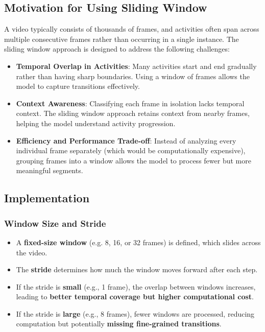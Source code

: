 \documentclass{article}
\begin{document}
\subsection{Motivation for Using Sliding Window}
A video typically consists of thousands of frames, and activities often span across multiple consecutive frames rather than occurring in a single instance. The sliding window approach is designed to address the following challenges:
\begin{itemize}
    \item \textbf{Temporal Overlap in Activities}: Many activities start and end gradually rather than having sharp boundaries. Using a window of frames allows the model to capture transitions effectively.
    \item \textbf{Context Awareness}: Classifying each frame in isolation lacks temporal context. The sliding window approach retains context from nearby frames, helping the model understand activity progression.
    \item \textbf{Efficiency and Performance Trade-off}: Instead of analyzing every individual frame separately (which would be computationally expensive), grouping frames into a window allows the model to process fewer but more meaningful segments.
\end{itemize}
\subsection{Implementation}
\subsubsection{Window Size and Stride}
\begin{itemize}
    \item A \textbf{fixed-size window} (e.g. 8, 16, or 32 frames) is defined, which slides across the video.
    \item The \textbf{stride} determines how much the window moves forward after each step.
    \item If the stride is \textbf{small} (e.g., 1 frame), the overlap between windows increases, leading to \textbf{better temporal coverage but higher computational cost}.
    \item If the stride is \textbf{large} (e.g., 8 frames), fewer windows are processed, reducing computation but potentially \textbf{missing fine-grained transitions}.
\end{itemize}
\end{document}
